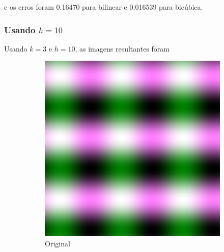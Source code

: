 \documentclass{article}
\begin{document}
e os erros foram 0.16470 para bilinear e 0.016539 para bicúbica.

\newpage

\subsubsection[Usando h=10]{Usando $h=10$}

Usando $k=3$ e $h=10$, as imagens resultantes foram

\begin{figure}[ht]
  \centering
  \begin{subfigure}{0.23\textwidth}
    \centering
    \includegraphics[width=\textwidth]{senoidal/senoidal.png}
    \caption{Original}
  \end{subfigure}%
  \hfill
  \begin{subfigure}{0.23\textwidth}
    \centering

\end{subfigure}
\end{figure}
\end{document}

